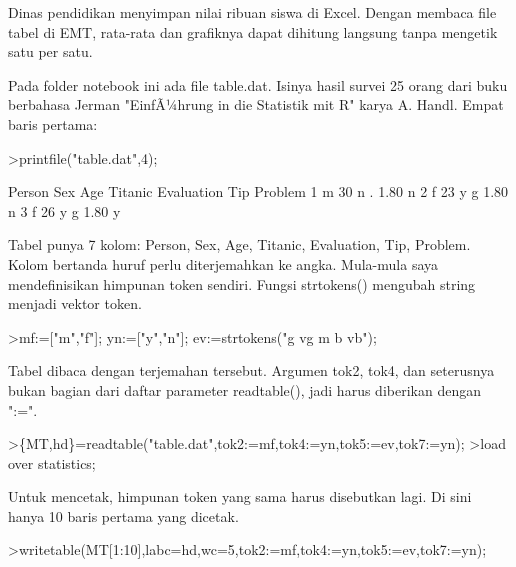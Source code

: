 \documentclass[a4paper,10pt]{article}
\begin{document}
\begin{eulernotebook}
\begin{eulercomment}
\begin{eulercomment}
\begin{eulercomment}
\begin{eulercomment}
\begin{eulercomment}
\begin{eulercomment}
\begin{eulercomment}
\begin{eulercomment}
\begin{eulercomment}
\end{eulercomment}
\begin{eulercomment}
Dinas pendidikan menyimpan nilai ribuan siswa di Excel. Dengan membaca file tabel di EMT,
rata-rata dan grafiknya dapat dihitung langsung tanpa mengetik satu per satu.

\end{eulercomment}
\begin{eulercomment}
Pada folder notebook ini ada file table.dat. Isinya hasil survei 25 orang dari buku
berbahasa Jerman "EinfÃ¼hrung in die Statistik mit R" karya A. Handl. Empat baris pertama:
\end{eulercomment}
\begin{eulerprompt}
>printfile("table.dat",4);
\end{eulerprompt}
\begin{euleroutput}
  Person Sex Age Titanic Evaluation Tip Problem
  1 m 30 n . 1.80 n
  2 f 23 y g 1.80 n
  3 f 26 y g 1.80 y
\end{euleroutput}
\begin{eulercomment}
Tabel punya 7 kolom: Person, Sex, Age, Titanic, Evaluation, Tip, Problem. Kolom bertanda
huruf perlu diterjemahkan ke angka. Mula-mula saya mendefinisikan himpunan token sendiri.
Fungsi strtokens() mengubah string menjadi vektor token.
\end{eulercomment}
\begin{eulerprompt}
>mf:=["m","f"]; yn:=["y","n"]; ev:=strtokens("g vg m b vb");
\end{eulerprompt}
\begin{eulercomment}
Tabel dibaca dengan terjemahan tersebut. Argumen tok2, tok4, dan seterusnya bukan bagian
dari daftar parameter readtable(), jadi harus diberikan dengan ":=".
\end{eulercomment}
\begin{eulerprompt}
>\{MT,hd\}=readtable("table.dat",tok2:=mf,tok4:=yn,tok5:=ev,tok7:=yn);
>load over statistics;
\end{eulerprompt}
\begin{eulercomment}
Untuk mencetak, himpunan token yang sama harus disebutkan lagi. Di sini hanya 10 baris
pertama yang dicetak.
\end{eulercomment}
\begin{eulerprompt}
>writetable(MT[1:10],labc=hd,wc=5,tok2:=mf,tok4:=yn,tok5:=ev,tok7:=yn);
\end{eulerprompt}
\begin{euleroutput}

\end{euleroutput}
\end{eulercomment}
\end{eulercomment}
\end{eulercomment}
\end{eulercomment}
\end{eulercomment}
\end{eulercomment}
\end{eulercomment}
\end{eulercomment}
\end{eulernotebook}
\end{document}
